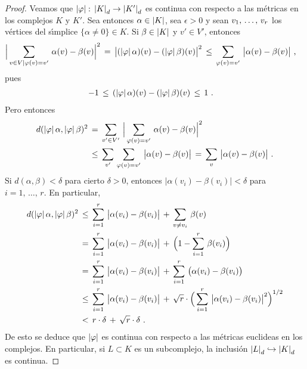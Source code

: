 \begin{proof}
	Veamos que $\left|\varphi\right|:\,\left|K\right|_{d}\rightarrow\left|K'\right|_{d}$
	es continua con respecto a las m\'{e}tricas en los complejos
	$K$ y $K'$. Sea entonces $\alpha\in\left|K\right|$, sea $\epsilon>0$ y
	sean $\lista{v}{r}$ los v\'{e}rtices del s\'{\i}mplice
	$\{\alpha\not=0\}\in K$. Si $\beta\in\left|K\right|$ y $v'\in V'$, entonces
	\begin{align*}
		\Big|\sum_{v\in V|\varphi(v)=v'}\,\alpha(v)-\beta(v)\Big|^{2}
			& \,=\,\big|(\left|\varphi\right|\alpha)(v)-
				(\left|\varphi\right|\beta)(v)\big|^{2}
			\,\leq\,\sum_{\varphi(v)=v'}\,
				\big|\alpha(v)-\beta(v)\big|
		\text{ ,}
	\end{align*}
	pues
	\begin{align*}
		-1 & \,\leq\,
			(\left|\varphi\right|\alpha)(v)-(\left|\varphi\right|\beta)(v)
			\,\leq\, 1
		\text{ .}
	\end{align*}
	Pero entonces
	\begin{align*}
		d(\left|\varphi\right|\alpha,\left|\varphi\right|\beta)^{2} & \,=\,
			\sum_{v'\in V'}\,\Big|\sum_{\varphi(v)=v'}\,
				\alpha(v)-\beta(v)\Big|^{2} \\
		& \,\leq\,\sum_{v'}\,\sum_{\varphi(v)=v'}\,
				\big|\alpha(v)-\beta(v)\big|
			\,=\,\sum_{v}\,\big|\alpha(v)-\beta(v)\big|
		\text{ .}
	\end{align*}
	Si $d(\alpha,\beta)<\delta$ para cierto $\delta>0$, entonces
	$\big|\alpha(v_{i})-\beta(v_{i})\big|<\delta$ para $i=1,\,\dots,\,r$.
	En particular,
	\begin{align*}
		d(\left|\varphi\right|\alpha,\left|\varphi\right|\beta)^{2} & \,\leq\,
			\sum_{i=1}^{r}\,\big|\alpha(v_{i})-\beta(v_{i})\big|
			\,+\, \sum_{v\not=v_{i}}\,\beta(v) \\
		& \,=\,\sum_{i=1}^{r}\,\big|\alpha(v_{i})-\beta(v_{i})\big|
			\,+\,\Big(1 - \sum_{i=1}^{r}\,\beta(v_{i})\Big) \\
		& \,=\,\sum_{i=1}^{r}\,\big|\alpha(v_{i})-\beta(v_{i})\big|
			\,+\,\sum_{i=1}^{r}\,
				\big(\alpha(v_{i})-\beta(v_{i})\big) \\
		& \,\leq\,\sum_{i=1}^{r}\,\big|\alpha(v_{i})-\beta(v_{i})\big|
			\,+\,\sqrt{r}\cdot\Big(\sum_{i=1}^{r}\,
				\big|\alpha(v_{i})-\beta(v_{i})\big|^{2}
				\Big)^{1/2} \\
		& \,<\, r\cdot\delta\,+\,\sqrt{r}\cdot\delta
		\text{ .}
	\end{align*}
	De esto se deduce que $\left|\varphi\right|$ es continua con respecto a
	las m\'{e}tricas euclideas en los complejos. En particular,
	si $L\subset K$ es un subcomplejo, la inclusi\'{o}n
	$\left|L\right|_{d}\hookrightarrow\left|K\right|_{d}$ es continua.


\end{proof}
